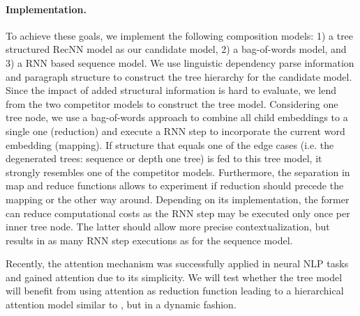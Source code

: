 \paragraph{Implementation.} To achieve these goals, we implement the following composition models: 1) a tree structured \ac{RecNN} model as our candidate model, 2) a bag-of-words model, and 3) a %
\ac{RNN} based sequence model. We use linguistic dependency parse information and paragraph structure to construct the tree hierarchy for the candidate model. Since the impact of added structural information is hard to evaluate, we lend from the two competitor models to construct the tree model. Considering one tree node, we use a bag-of-words approach to combine all child embeddings to a single one (reduction) and execute a \ac{RNN} step to incorporate the current word embedding (mapping).
If structure that equals one of the edge cases (i.e. the degenerated trees: sequence or depth one tree) is fed to this tree model, it strongly resembles one of the competitor models. Furthermore, the separation in map and reduce functions allows to experiment if reduction should precede the mapping or the other way around. Depending on its implementation, the former can reduce computational costs as the \ac{RNN} step may be executed only once per inner tree node. The latter should allow more precise contextualization, but results in as many \ac{RNN} step executions as for the sequence model. 

Recently, the attention mechanism \autocite{bahdanau_neural_2014,xu_show_2015} was successfully applied in neural \ac{NLP} tasks \autocite{zhuang_neobility_2017,vaswani_attention_2017} and gained attention due to its simplicity. We will test whether the tree model will benefit from using attention as reduction function leading to a hierarchical attention model similar to \textcite{yang_hierarchical_2016}, but in a dynamic fashion. %

